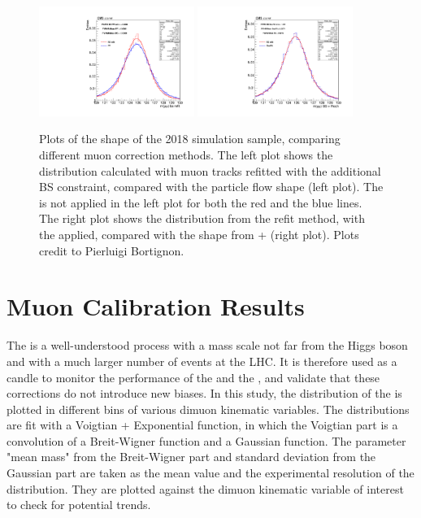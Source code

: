 \begin{figure}[!htb]
      \centering
      \includegraphics[width=0.45\textwidth]{pics/muon_corr/GeoFit/track_refit/ggH_mass_muon_fit_bs_pf_2018.pdf}
      \includegraphics[width=0.45\textwidth]{pics/muon_corr/GeoFit/track_refit/ggH_mass_muon_fit_bs_geofit_2018.pdf}
      \caption{Plots of the \mmm shape of the 2018 \ggH simulation sample, comparing different muon correction methods.
               The left plot shows the \mmm distribution calculated with muon tracks refitted with the additional BS constraint, 
               compared with the particle flow shape (left plot).
               The \RochCorr is not applied in the left plot for both the red and the blue lines.
               The right plot shows the \mmm distribution from the refit method, with the \RochCorr applied,
               compared with the shape from \GeoFit + \RochCorr (right plot).
               Plots credit to Pierluigi Bortignon.}
      \label{fig:refit_vs_geofit}
\end{figure}

\section{Muon Calibration Results} \label{sec:muon_cal}

The \zmm is a well-understood process with a mass scale not far from the Higgs boson and with a much larger number of events at the LHC.
It is therefore used as a candle to monitor the performance of the \RochCorr and the \GeoFit, 
and validate that these corrections do not introduce new biases.
In this study, the distribution of the \mmm is plotted in different bins of various dimuon kinematic variables.
The \mmm distributions are fit with a Voigtian + Exponential function, 
in which the Voigtian part is a convolution of a Breit-Wigner function and a Gaussian function.
The parameter "mean mass" from the Breit-Wigner part and standard deviation from the Gaussian part are 
taken as the mean value and the experimental resolution of the \mmm distribution.
They are plotted against the dimuon kinematic variable of interest to check for potential trends.

